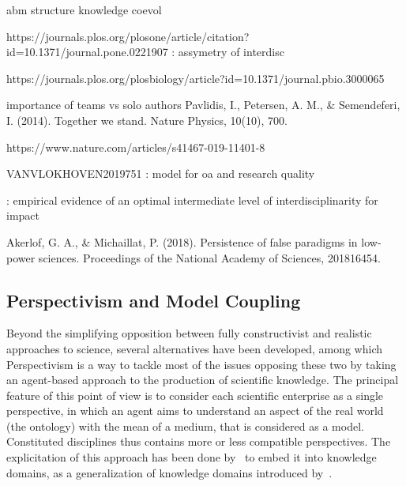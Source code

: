 \cite{jang2019coevolutionary} abm structure knowledge coevol

https://journals.plos.org/plosone/article/citation?id=10.1371/journal.pone.0221907 : assymetry of interdisc

https://journals.plos.org/plosbiology/article?id=10.1371/journal.pbio.3000065

importance of teams vs solo authors Pavlidis, I., Petersen, A. M., \& Semendeferi, I. (2014). Together we stand. Nature Physics, 10(10), 700.

https://www.nature.com/articles/s41467-019-11401-8

VANVLOKHOVEN2019751 : model for oa and research quality


\cite{lariviere2010relationship} : empirical evidence of an optimal intermediate level of interdisciplinarity for impact %


Akerlof, G. A., \& Michaillat, P. (2018). Persistence of false paradigms in low-power sciences. Proceedings of the National Academy of Sciences, 201816454.


\subsection*{Perspectivism and Model Coupling}

Beyond the simplifying opposition between fully constructivist and realistic approaches to science, several alternatives have been developed, among which Perspectivism \cite{giere2010scientific} is a way to tackle most of the issues opposing these two by taking an agent-based approach to the production of scientific knowledge. The principal feature of this point of view is to consider each scientific enterprise as a single perspective, in which an agent aims to understand an aspect of the real world (the ontology) with the mean of a medium, that is considered as a model. Constituted disciplines thus contains more or less compatible perspectives. The explicitation of this approach has been done by~\cite{raimbault2017knowledge} to embed it into knowledge domains, as a generalization of knowledge domains introduced by~\cite{livet2010}.


